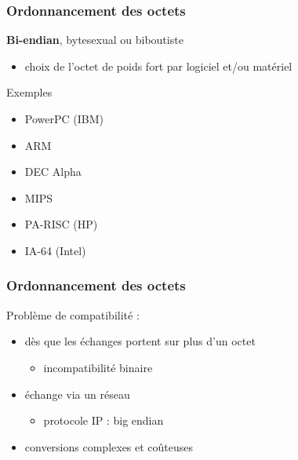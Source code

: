 \begin{frame}
\frametitle{Ordonnancement des octets}
\textbf{Bi-endian}, bytesexual ou biboutiste
\begin{itemize}
\item choix de l'octet de poids fort par logiciel et/ou matériel
\end{itemize}

\begin{exampleblock}{Exemples}
\begin{itemize}
\item PowerPC (IBM)
\item ARM
\item DEC Alpha
\item MIPS
\item PA-RISC (HP)
\item IA-64 (Intel)
\end{itemize}

\end{exampleblock}
\end{frame}

\begin{frame}
\frametitle{Ordonnancement des octets}
Problème de compatibilité :
\begin{itemize}
\item dès que les échanges portent sur plus d'un octet
\begin{itemize}
\item incompatibilité binaire
\end{itemize}
\item échange via un réseau
\begin{itemize}
\item protocole IP : big endian
\end{itemize}

\item conversions complexes et coûteuses
\end{itemize}
\end{frame}

